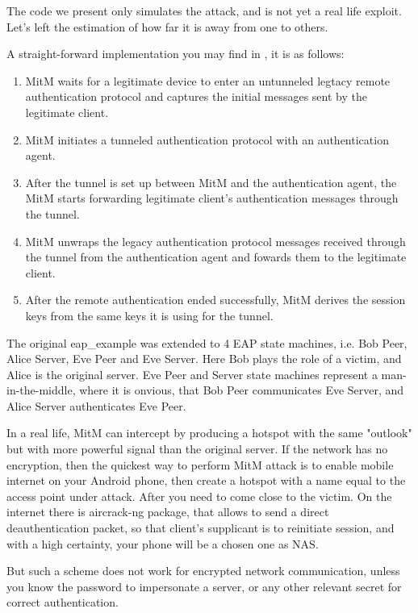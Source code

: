 \documentclass{amsart}
\begin{document}
The code \cite{GMI} we present only simulates the attack,
and is not yet a real life exploit.
Let's left the estimation of how far it is away from one
to others.

A straight-forward implementation you may find in \cite{tap2002},
it is as follows:
\begin{enumerate}
  \item MitM waits for a legitimate device to enter an untunneled legtacy remote
    authentication protocol
    and captures the initial messages sent by the legitimate client.
  \item MitM initiates a tunneled authentication protocol with an authentication
    agent.
  \item After the tunnel is set up between MitM and the authentication agent,
    the MitM starts forwarding legitimate client's authentication messages
    through the tunnel.
  \item MitM unwraps the legacy authentication protocol messages received through
    the tunnel from the authentication agent
    and fowards them to the legitimate client.
  \item After the remote authentication ended successfully,
    MitM derives the session keys from the same keys it is using for the tunnel.
\end{enumerate}

The original eap\_example was extended to 4 EAP state machines,
i.e. Bob Peer, Alice Server, Eve Peer and Eve Server.
Here Bob plays the role of a victim,
and Alice is the original server.
Eve Peer and Server state machines represent
a man-in-the-middle,
where it is onvious,
that Bob Peer communicates Eve Server,
and Alice Server authenticates Eve Peer.

In a real life, MitM can intercept by producing a hotspot with the same
"outlook" but with more powerful signal than the original server.
If the network has no encryption,
then the quickest way to perform MitM attack is to enable mobile
internet on your Android phone,
then create a hotspot with a name equal to the access point under attack.
After you need to come close to the victim.
On the internet there is aircrack-ng package,
that allows to send a direct deauthentication packet,
so that client's supplicant is to reinitiate session,
and with a high certainty, your phone will be a chosen one as NAS.

But such a scheme does not work for encrypted network communication,
unless you know the password to impersonate a server,
or any other relevant secret for correct authentication.
\end{document}
